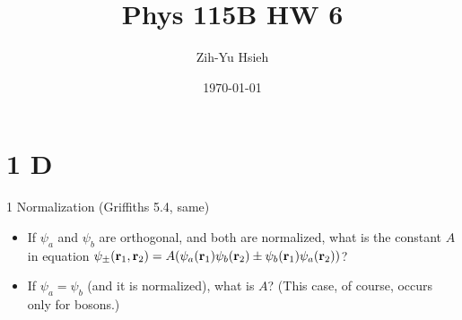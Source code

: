 \documentclass{article}
\title{Phys 115B HW 6}
\author{Zih-Yu Hsieh}
\date{\today}
\begin{document}
\maketitle

\section*{1 D}
\begin{ques}
1 Normalization (Griffiths 5.4, same)

\begin{itemize}
    \item[(a)] If $\psi_a$ and $\psi_b$ are orthogonal, and both are normalized, what is the constant $A$ in equation $\psi_{\pm}(\mathbf{r}_1,\mathbf{r}_2) = A(\psi_a(\mathbf{r}_1)\psi_b(\mathbf{r}_2)\pm \psi_b(\mathbf{r}_1)\psi_a(\mathbf{r}_2))$?
    \item[(b)] If $\psi_a=\psi_b$ (and it is normalized), what is $A$? (This case, of course, occurs only for bosons.) 
\end{itemize}
\end{ques}
\end{document}
